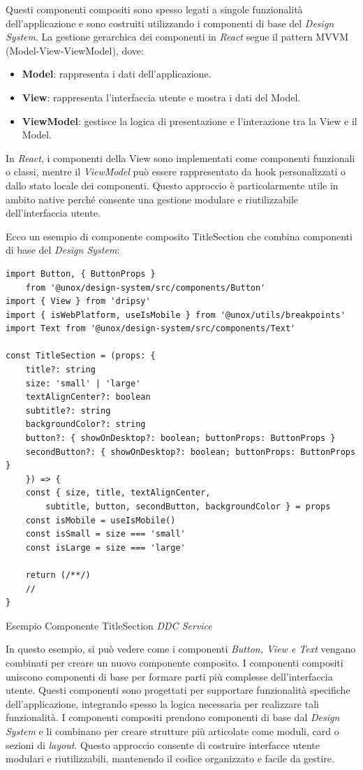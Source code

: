 Questi componenti compositi sono spesso legati a singole funzionalità dell'applicazione e sono costruiti utilizzando i componenti di base del \textit{Design System}. 
La gestione gerarchica dei componenti in \textit{React} segue il pattern MVVM (Model-View-ViewModel), dove:

\begin{itemize}
    \item \textbf{Model}: rappresenta i dati dell'applicazione.
    \item \textbf{View}: rappresenta l'interfaccia utente e mostra i dati del Model.
    \item \textbf{ViewModel}: gestisce la logica di presentazione e l'interazione tra la View e il Model.
\end{itemize}

In \textit{React}, i componenti della View sono implementati come componenti funzionali o classi, 
mentre il \textit{ViewModel} può essere rappresentato da hook personalizzati o dallo stato locale dei componenti.
Questo approccio è particolarmente utile in ambito native perché consente una gestione modulare e riutilizzabile dell'interfaccia utente.

Ecco un esempio di componente composito TitleSection che combina componenti di base del \textit{Design System}:


\begin{listing}[H]
    \begin{verbatim} 
import Button, { ButtonProps } 
    from '@unox/design-system/src/components/Button'
import { View } from 'dripsy'
import { isWebPlatform, useIsMobile } from '@unox/utils/breakpoints'
import Text from '@unox/design-system/src/components/Text'

const TitleSection = (props: {
    title?: string
    size: 'small' | 'large'
    textAlignCenter?: boolean
    subtitle?: string
    backgroundColor?: string
    button?: { showOnDesktop?: boolean; buttonProps: ButtonProps }
    secondButton?: { showOnDesktop?: boolean; buttonProps: ButtonProps }
    }) => {
    const { size, title, textAlignCenter, 
        subtitle, button, secondButton, backgroundColor } = props
    const isMobile = useIsMobile()
    const isSmall = size === 'small'
    const isLarge = size === 'large'

    return (/**/)
    //
}
    \end{verbatim}
    \caption{Esempio Componente TitleSection \textit{DDC Service}}
    \label{listing_titlesection_ddcservice}
\end{listing}
In questo esempio, si può vedere come i componenti \textit{Button, View e Text} vengano combinati per creare un nuovo componente composito.
I componenti compositi uniscono componenti di base per formare parti più complesse dell'interfaccia utente.
Questi componenti sono progettati per supportare funzionalità specifiche dell'applicazione, integrando spesso la logica necessaria per realizzare tali funzionalità.
I componenti compositi prendono componenti di base dal \textit{Design System} e li combinano per creare strutture più articolate come moduli, card o sezioni di \textit{layout}.
Questo approccio consente di costruire interfacce utente modulari e riutilizzabili, mantenendo il codice organizzato e facile da gestire.


